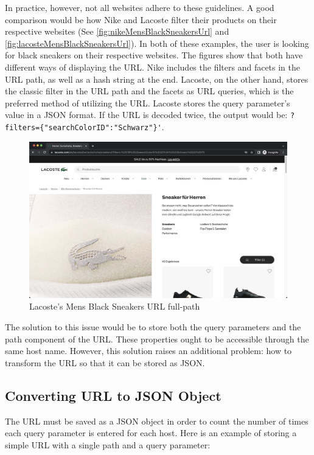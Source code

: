In practice, however, not all websites adhere to these guidelines. A good comparison would be how Nike and Lacoste filter their products on their respective websites (See \autoref{fig:nikeMensBlackSneakersUrl} and \autoref{fig:lacosteMensBlackSneakersUrl}). In both of these examples, the user is looking for black sneakers on their respective websites. The figures show that both have different ways of displaying the URL. Nike includes the filters and facets in the URL path, as well as a hash string at the end. Lacoste, on the other hand, stores the classic filter in the URL path and the facets as URL queries, which is the preferred method of utilizing the URL. Lacoste stores the query parameter's value in a JSON format. If the URL is decoded twice, the output would be: \verb;?filters={"searchColorID":"Schwarz"}';.

\begin{figure}[H]
  \includegraphics[width=\textwidth]{assets/screenshot_lacoste_website.png}
  \caption{Lacoste's Mens Black Sneakers URL full-path}
  \label{fig:lacosteMensBlackSneakersUrl}
\end{figure}

The solution to this issue would be to store both the query parameters and the path component of the URL. These properties ought to be accessible through the same host name. However, this solution raises an additional problem: how to transform the URL so that it can be stored as JSON.

\subsection*{Converting URL to JSON Object}
The URL must be saved as a JSON object in order to count the number of times each query parameter is entered for each host. Here is an example of storing a simple URL with a single path and a query parameter:

